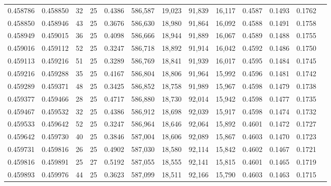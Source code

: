 \begin{tabular}{rrrrrrrrrrrrr}
0.458786 & 0.458850 &    32 &  25 &                                     0.4386 & 586,587 &  19,023 &  91,839 &  16,117 & 0.4587 & 0.1493 & 0.1762 \\
0.458850 & 0.458946 &    43 &  25 &                                     0.3676 & 586,630 &  18,980 &  91,864 &  16,092 & 0.4588 & 0.1491 & 0.1758 \\
0.458949 & 0.459015 &    36 &  25 &                                     0.4098 & 586,666 &  18,944 &  91,889 &  16,067 & 0.4589 & 0.1488 & 0.1755 \\
0.459016 & 0.459112 &    52 &  25 &                                     0.3247 & 586,718 &  18,892 &  91,914 &  16,042 & 0.4592 & 0.1486 & 0.1750 \\
0.459113 & 0.459216 &    51 &  25 &                                     0.3289 & 586,769 &  18,841 &  91,939 &  16,017 & 0.4595 & 0.1484 & 0.1745 \\
0.459216 & 0.459288 &    35 &  25 &                                     0.4167 & 586,804 &  18,806 &  91,964 &  15,992 & 0.4596 & 0.1481 & 0.1742 \\
0.459289 & 0.459371 &    48 &  25 &                                     0.3425 & 586,852 &  18,758 &  91,989 &  15,967 & 0.4598 & 0.1479 & 0.1738 \\
0.459377 & 0.459466 &    28 &  25 &                                     0.4717 & 586,880 &  18,730 &  92,014 &  15,942 & 0.4598 & 0.1477 & 0.1735 \\
0.459467 & 0.459532 &    32 &  25 &                                     0.4386 & 586,912 &  18,698 &  92,039 &  15,917 & 0.4598 & 0.1474 & 0.1732 \\
0.459533 & 0.459642 &    52 &  25 &                                     0.3247 & 586,964 &  18,646 &  92,064 &  15,892 & 0.4601 & 0.1472 & 0.1727 \\
0.459642 & 0.459730 &    40 &  25 &                                     0.3846 & 587,004 &  18,606 &  92,089 &  15,867 & 0.4603 & 0.1470 & 0.1723 \\
0.459731 & 0.459816 &    26 &  25 &                                     0.4902 & 587,030 &  18,580 &  92,114 &  15,842 & 0.4602 & 0.1467 & 0.1721 \\
0.459816 & 0.459891 &    25 &  27 &                                     0.5192 & 587,055 &  18,555 &  92,141 &  15,815 & 0.4601 & 0.1465 & 0.1719 \\
0.459893 & 0.459976 &    44 &  25 &                                     0.3623 & 587,099 &  18,511 &  92,166 &  15,790 & 0.4603 & 0.1463 & 0.1715 \\

\end{tabular}
